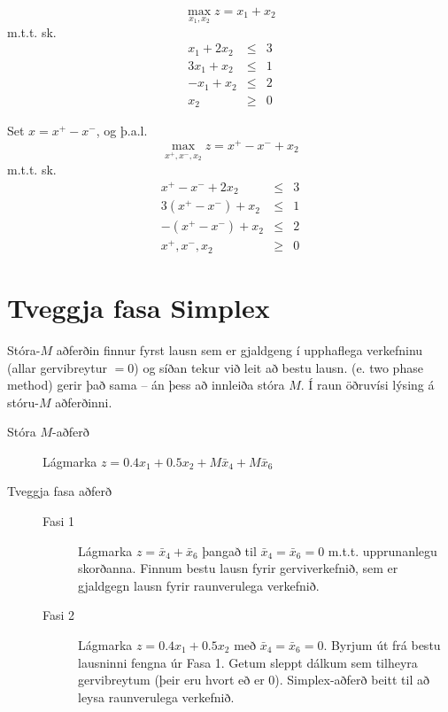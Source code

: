 \begin{daemi}
$$\max_{x_1,x_2}  z = x_1 + x_2     $$
m.t.t. sk.
\begin{eqnarray*}
x_1 + 2x_2 & \le &  3 \\
3x_1 + x_2 &\le & 1 \\
-x_1 + x_2 &\le & 2 \\
x_2 &\ge& 0   
\end{eqnarray*}
 
\end{daemi}
\begin{lausn}Set $x=x^+-x^-$, og þ.a.l.
$$\max_{x^+,x^-,x_2} z = x^+-x^- + x_2     $$
m.t.t. sk.
\begin{eqnarray*}
x^+-x^- + 2x_2 & \le & 3 \\
3(x^+-x^-) + x_2 &\le&  1 \\
-(x^+-x^-) + x_2 &\le & 2 \\
x^+,x^-,x_2 &\ge& 0   
\end{eqnarray*}
 
\end{lausn}


\section{Tveggja fasa Simplex}
Stóra-$M$ aðferðin finnur fyrst lausn sem er gjaldgeng í upphaflega verkefninu (allar gervibreytur $=0$) og síðan tekur við leit að bestu lausn. 
 (e. two phase method) gerir það sama -- án þess að innleiða stóra $M$. Í raun öðruvísi lýsing á stóru-$M$ aðferðinni. 

\begin{description}
  \item[Stóra $M$-aðferð] Lágmarka $z=0.4x_1+0.5x_2+M\bar{x}_4+M\bar{x}_6$
 \item[Tveggja fasa aðferð]\hspace{.1cm}
\begin{description}
 \item[Fasi 1] Lágmarka $z=\bar{x}_4+\bar{x}_6$ þangað til $\bar{x}_4=\bar{x}_6=0$ m.t.t. upprunanlegu skorðanna. Finnum bestu lausn fyrir gerviverkefnið, sem er gjaldgegn lausn fyrir raunverulega verkefnið.
 \item[Fasi 2] Lágmarka $z=0.4x_1+0.5x_2$ með $\bar{x}_4=\bar{x}_6=0$. Byrjum út frá bestu lausninni fengna úr Fasa 1. Getum sleppt dálkum sem tilheyra gervibreytum (þeir eru hvort eð er 0). Simplex-aðferð beitt til að leysa raunverulega verkefnið.
\end{description}
\end{description}

